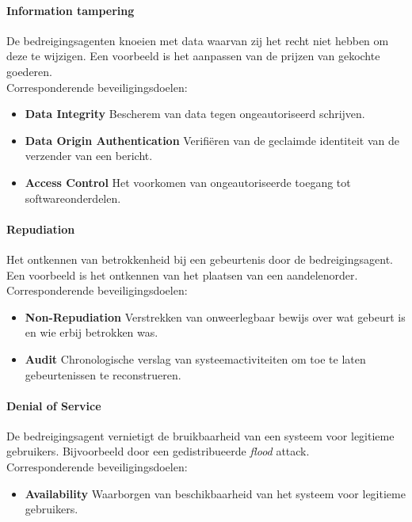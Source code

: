\documentclass[../main.tex]{subfiles}
\begin{document}
\paragraph{Information tampering} 
De bedreigingsagenten knoeien met data waarvan zij het recht niet hebben om deze te wijzigen. Een voorbeeld is het aanpassen van de prijzen van gekochte goederen. 
\\
Corresponderende beveiligingsdoelen:
\begin{itemize}
	\item \textbf{Data Integrity} Bescherem van data tegen ongeautoriseerd schrijven.
	\item \textbf{Data Origin Authentication} Verifi\"eren van de geclaimde identiteit van de verzender van een bericht. 
	\item \textbf{Access Control} Het voorkomen van ongeautoriseerde toegang tot softwareonderdelen.
\end{itemize}

\paragraph{Repudiation} Het ontkennen van betrokkenheid bij een gebeurtenis door de bedreigingsagent. Een voorbeeld is het ontkennen van het plaatsen van een aandelenorder. 
\\
Corresponderende beveiligingsdoelen:
\begin{itemize}
	\item \textbf{Non-Repudiation} Verstrekken van onweerlegbaar bewijs over wat gebeurt is en wie erbij betrokken was.
	\item \textbf{Audit} Chronologische verslag van systeemactiviteiten om toe te laten gebeurtenissen te reconstrueren.
\end{itemize}

\paragraph{Denial of Service}
De bedreigingsagent vernietigt de bruikbaarheid van een systeem voor legitieme gebruikers. Bijvoorbeeld door een gedistribueerde \textit{flood} attack.
\\
Corresponderende beveiligingsdoelen:
\begin{itemize}
	\item \textbf{Availability} Waarborgen van beschikbaarheid van het systeem voor legitieme gebruikers.
\end{itemize}
\end{document}
